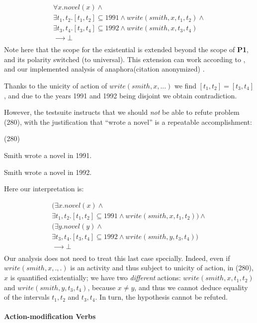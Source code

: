 \documentclass[a4paper,11pt]{article}
\newcommand\hyp{\item[H]}
\newcommand\fracasex[2]{\begin{lingex}\item[(#1)] \begin{subex} #2 \end{subex} \end{lingex} }
\begin{document}
\begin{equation}
  \label{eq:smith-novel-1}
\begin{array}{l}
∀x. novel(x) ∧ \\
∃t_1,t_2. [t_1,t_2] ⊆ 1991 ∧ write(smith,x,t_1,t_2) ∧ \\
∃t_3,t_4. [t_3,t_4] ⊆ 1992 ∧ write(smith,x,t_3,t_4) \\
⟶ ⊥ \\
\end{array}
\end{equation}
Note here that the scope for the existential is extended beyond the
scope of \textbf{P1}, and its polarity switched (to universal). This extension can work according to
\citet{unger_dynamic_2011}, and our implemented analysis of
anaphora\ifanon (citation anonymized)
\else\citep{bernardy_computational_2018,bernardy_wide-coverage_2019}\fi.

Thanks to the unicity of action of $write(smith,x,...)$ we find
\([t_1,t_2] = [t_3,t_4]\), and due to the years 1991 and 1992 being
disjoint we obtain contradiction.

However, the testsuite instructs that we should \emph{not} be able to refute
problem (280), with the justification that ``wrote a novel'' is a repeatable
accomplishment:

\fracasex{280}{
\item	Smith wrote a novel in 1991.
\hyp 	Smith wrote a novel in 1992.
}
Here our interpretation is:

\[\begin{array}{l}
(∃x. novel(x) ∧ \\
∃t_1,t_2. [t_1,t_2] ⊆ 1991 ∧ write(smith,x,t_1,t_2)) ∧ \\
(∃y. novel(y) ∧ \\
∃t_3,t_4. [t_3,t_4] ⊆ 1992 ∧ write(smith,y,t_3,t_4)) \\
⟶ ⊥ \\
\end{array}
\]
Our analysis does not need to treat this last case specially. Indeed,
even if $write(smith,x,.,.)$ is an activity and thus subject to
unicity of action, in (280), $x$ is quantified existentially; we have
two \emph{different} actions: $write(smith,x,t_1,t_2)$ and
$write(smith,y,t_3,t_4)$, because $x \neq y$, and thus we cannot
deduce equality of the intervals $t_1,t_2$ and $t_3,t_4$. In turn, the
hypothesis cannot be refuted.

\paragraph{Action-modification Verbs}
\end{document}
